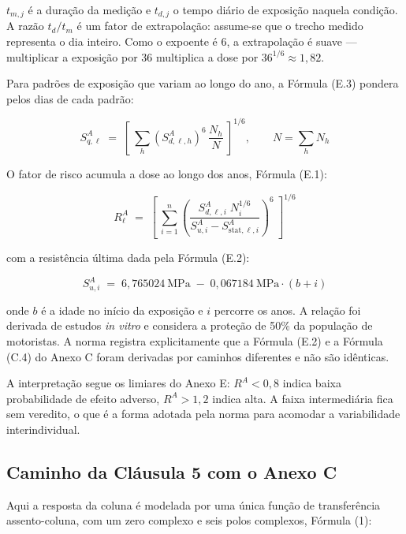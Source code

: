 \documentclass[11pt,a4paper]{article}
\begin{document}
\noindent
$t_{m,j}$ é a duração da medição e $t_{d,j}$ o tempo diário de exposição naquela
condição. A razão $t_d/t_m$ é um fator de extrapolação: assume-se que o trecho
medido representa o dia inteiro. Como o expoente é 6, a extrapolação é suave ---
multiplicar a exposição por 36 multiplica a dose por $36^{1/6} \approx 1{,}82$.

Para padrões de exposição que variam ao longo do ano, a Fórmula (E.3) pondera
pelos dias de cada padrão:

\begin{equation}
S^{A}_{q,\ell} \;=\; \left[\ \sum_{h}
    \left(S^{A}_{d,\ell,h}\right)^{6}\, \frac{N_h}{N}\ \right]^{1/6},
\qquad N = \sum_h N_h
\label{eq:e3}
\end{equation}

O fator de risco acumula a dose ao longo dos anos, Fórmula (E.1):

\begin{equation}
R^{A}_\ell \;=\; \left[\ \sum_{i=1}^{n}
   \left( \frac{S^{A}_{d,\ell,i}\; N_i^{1/6}}
               {S^{A}_{u,i} - S^{A}_{\mathrm{stat},\ell,i}} \right)^{6}
   \ \right]^{1/6}
\label{eq:e1}
\end{equation}

\noindent
com a resistência última dada pela Fórmula (E.2):

\begin{equation}
S^{A}_{u,i} \;=\; 6{,}765024\ \mathrm{MPa}
   \;-\; 0{,}067184\ \mathrm{MPa}\cdot (b+i)
\label{eq:e2}
\end{equation}

\noindent
onde $b$ é a idade no início da exposição e $i$ percorre os anos. A relação foi
derivada de estudos \emph{in vitro} e considera a proteção de 50\% da população
de motoristas. A norma registra explicitamente que a Fórmula (E.2) e a Fórmula
(C.4) do Anexo C foram derivadas por caminhos diferentes e não são idênticas.

A interpretação segue os limiares do Anexo E: $R^A < 0{,}8$ indica baixa
probabilidade de efeito adverso, $R^A > 1{,}2$ indica alta. A faixa intermediária
fica sem veredito, o que é a forma adotada pela norma para acomodar a
variabilidade interindividual.

\subsection{Caminho da Cláusula 5 com o Anexo C}

Aqui a resposta da coluna é modelada por uma única função de transferência
assento-coluna, com um zero complexo e seis polos complexos, Fórmula (1):
\end{document}
